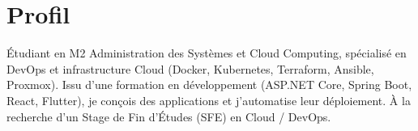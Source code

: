 \section{Profil}
    \vspace{0.2em}
    Étudiant en M2 Administration des Systèmes et Cloud Computing, spécialisé en DevOps et infrastructure Cloud
    (Docker, Kubernetes, Terraform, Ansible, Proxmox). Issu d'une formation en développement (ASP.NET Core,
    Spring Boot, React, Flutter), je conçois des applications et j'automatise leur déploiement.
    À la recherche d'un Stage de Fin d'Études (SFE) en Cloud / DevOps.

